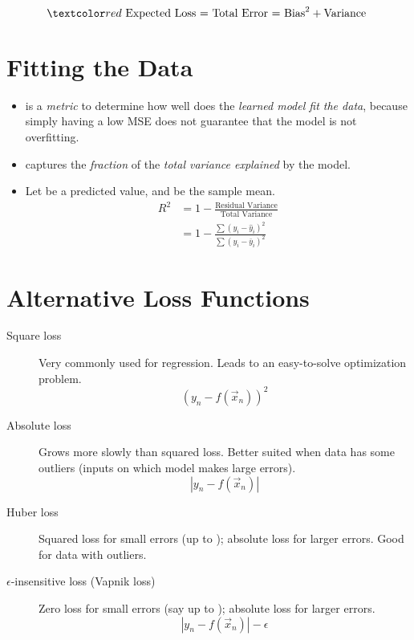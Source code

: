 \documentclass[
	number={5},
	title={Linear Regression}
]{cs584notes}
\begin{document}
\[ \data{ \mbox{ Expected Loss = Total Error = Bias}^{2} + \mbox{Variance } } \]

\section{Fitting the Data}\label{sec:fitting-the-data}
\begin{itemize}
	\item {} is a \emph{metric} to determine how well does the \emph{learned model fit the data}, because simply having a low MSE does not guarantee that the model is not overfitting.
	\item {} captures the \emph{fraction} of the \emph{total variance explained} by the model.
	\item Let  be a predicted value, and  be the sample mean.
	\begin{equation}
		\begin{aligned}
			R^{2} &= 1 - \frac{\mbox{Residual Variance}}{\mbox{Total Variance}}\\
				  &= 1 - \frac{\sum (y_{i} - \hat{y}_{i})^{2}}{\sum (y_{i} - \bar{y}_{i})^{2}}
		\end{aligned}
		\label{eq:r2}
	\end{equation}
\end{itemize}

\section{Alternative Loss Functions}\label{sec:alternative-loss-functions}
\begin{description}
	\item[Square loss] Very commonly used for regression. Leads to an easy-to-solve optimization problem.
	\begin{equation}
		\left( y_{n} - f(\vec{x}_{n}) \right)^{2}
		\label{eq:quared-loss}
	\end{equation}
	\item[Absolute loss] Grows more slowly than squared loss. Better suited when data has some outliers (inputs on which model makes large errors).
	\begin{equation}
		| y_{n} - f(\vec{x}_{n}) |
		\label{eq:absolute-loss}
	\end{equation}
	\item[Huber loss] Squared loss for small errors (up to \data{$\delta$}); absolute loss for larger errors. Good for data with outliers. %
	\item[$\epsilon$-insensitive loss (Vapnik loss)] Zero loss for small errors (say up to \data{$\epsilon$}); absolute loss for larger errors.
	\begin{equation}
		| y_{n} - f(\vec{x}_{n}) | - \epsilon
		\label{eq:loss}
	\end{equation}
\end{description}
\end{document}
